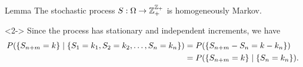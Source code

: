 \documentclass[12pt,aspectratio=169]{beamer}
\begin{document}
\begin{frame}
\begin{block}{Lemma} 
The stochastic process $S:\Omega\to\mathbb{Z}_+^{\mathbb{Z}_+}$ is homogeneously Markov. 
\end{block}

\begin{Proof}<2-> 
Since the process has stationary and independent increments, we have 
\begin{align*}
P(\left\{S_{n+m} = k\right\} \mid\left\{S_1 = k_1, S_2  = k_2, \dots, S_n = k_n\right\}) 
&= P(\left\{S_{n+m}  - S_n = k - k_n\right\}) \\
&= P(\left\{S_{n+m} = k\right\}\mid\left\{S_n = k_n\right\}). 
\end{align*}
\end{Proof}
\end{frame}
\end{document}
